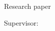 \begin{titlepage}
    \begin{center}
        \vspace*{1cm}
        
        \Huge
        \textbf{\myTitle}
        
        \vspace{1cm}
        \LARGE
    
        \textbf{\myName \mySurname}
        
        \vfill
        
        Research paper
        
        \Large
    
        Supervisor: \myTutor

        \vspace{1.8cm}
        
        \textbf{\myUniversity}\\
        \myDepartament\\
        \myLocation \currentYear
        
    \end{center}
    
\end{titlepage}